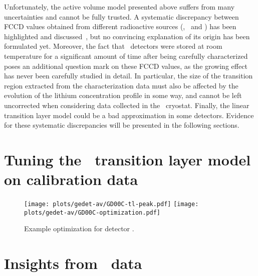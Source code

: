 Unfortunately, the active volume model presented above suffers from many uncertainties and
cannot be fully trusted. A systematic discrepancy between FCCD values obtained from
different radioactive sources (\Am, \Ba\ and \Co) has been highlighted and
discussed~\cite{Lehnert2016}, but no convincing explanation of its origin has been
formulated yet. Moreover, the fact that \bege\ detectors were stored at room temperature
for a significant amount of time after being carefully characterized poses an additional
question mark on these FCCD values, as the growing effect has never been carefully studied
in detail. In particular, the size of the transition region extracted from the
characterization data must also be affected by the evolution of the lithium concentration
profile in some way, and cannot be left uncorrected when considering data collected in the
\gerda\ cryostat. Finally, the linear transition layer model could be a bad approximation
in some detectors. Evidence for these systematic discrepancies will be presented in the
following sections.

\section{Tuning the \bege\ transition layer model on calibration data}%
\label{sec:gedetav:calib-optim}


\begin{table}
  \centering
  \caption{%
    \bege\ dead layer fractions obtained from calibration data. 
  }\label{tab:gedetav:calib-optim}
  
\end{table}

\begin{figure}
  \centering
  \texttt{[image: plots/gedet-av/GD00C-tl-peak.pdf]}%
  \texttt{[image: plots/gedet-av/GD00C-optimization.pdf]}
  \caption{%
    Example optimization for detector . 
  }\label{fig:gedetav:example-optim}
\end{figure}

\section{Insights from \Arl\ data}%
\label{src:gedetav:ar39}

